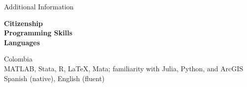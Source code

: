 \documentclass{resume} %
\begin{document}
	\begin{rSection}{Additional Information}
		\begin{minipage}[t]{0.25\textwidth}
			\textbf{Citizenship}\\

			\textbf{Programming Skills}\\

			\textbf{Languages}
		\end{minipage}
		\begin{minipage}[t]{0.75\textwidth}
				Colombia\\

				MATLAB, Stata, R, \LaTeX, Mata; familiarity with Julia, Python, and ArcGIS\\

				Spanish (native), English (fluent)
		\end{minipage}
	\end{rSection}
\end{document}
